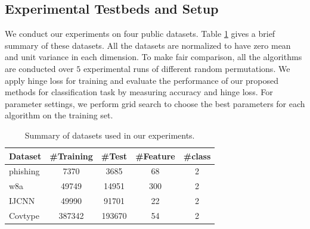 \documentclass[letterpaper]{article} %
\begin{document}
\subsection{Experimental Testbeds and Setup}
We conduct our experiments on four public datasets. Table \ref{tab0} gives a brief summary of these datasets. All the datasets are normalized to have zero mean and unit variance in each dimension. To make fair comparison, all the algorithms are conducted over $5$ experimental runs of different random permutations. We apply hinge loss for training and evaluate the performance of our proposed methods for classification task by measuring accuracy and hinge loss. For parameter settings, we perform grid search to choose the best parameters for each algorithm on the training set.
\begin{table}[htb]
	\centering
		\begin{tabular} {|l|c|c|c|c|}
			\hline
			Dataset & \#Training & \#Test & \#Feature   & \#class \\
			\hline
			phishing	& 7370		& 3685		& 68	& 2\\
			w8a			& 49749		& 14951		& 300	& 2\\
			IJCNN       & 49990     & 91701     & 22	& 2\\
			Covtype		& 387342	& 193670	& 54	& 2\\
			\hline
		\end{tabular}
	\caption{Summary of datasets used in our experiments.}
	\label{tab0}
\end{table}
\end{document}
